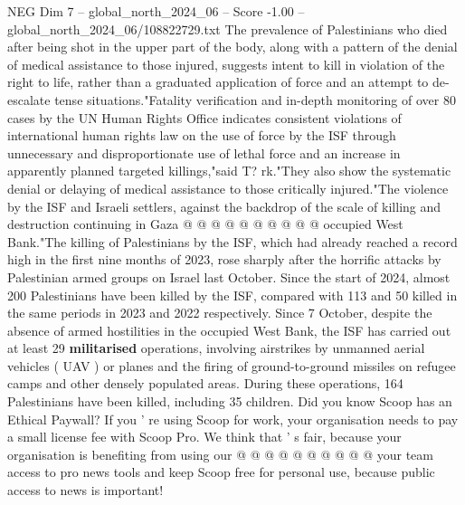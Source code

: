 \begin{textsample}{NEG Dim 7 – global\_north\_2024\_06 – Score -1.00 – global\_north\_2024\_06/108822729.txt}
The prevalence of Palestinians who died after being shot in the upper part of the body, along with a pattern of the denial of medical assistance to those injured, suggests intent to kill in violation of the right to life, rather than a graduated application of force and an attempt to de-escalate tense situations."Fatality verification and in-depth monitoring of over 80 cases by the UN Human Rights Office indicates consistent violations of international human rights law on the use of force by the ISF through unnecessary and disproportionate use of lethal force and an increase in apparently planned targeted killings,"said T? rk."They also show the systematic denial or delaying of medical assistance to those critically injured."The violence by the ISF and Israeli settlers, against the backdrop of the scale of killing and destruction continuing in Gaza @ @ @ @ @ @ @ @ @ @ occupied West Bank."The killing of Palestinians by the ISF, which had already reached a record high in the first nine months of 2023, rose sharply after the horrific attacks by Palestinian armed groups on Israel last October.
Since the start of 2024, almost 200 Palestinians have been killed by the ISF, compared with 113 and 50 killed in the same periods in 2023 and 2022 respectively.
Since 7 October, despite the absence of armed hostilities in the occupied West Bank, the ISF has carried out at least 29 \textbf{militarised} operations, involving airstrikes by unmanned aerial vehicles ( UAV ) or planes and the firing of ground-to-ground missiles on refugee camps and other densely populated areas.
During these operations, 164 Palestinians have been killed, including 35 children.
Did you know Scoop has an Ethical Paywall?
If you ' re using Scoop for work, your organisation needs to pay a small license fee with Scoop Pro.
We think that ' s fair, because your organisation is benefiting from using our @ @ @ @ @ @ @ @ @ @ your team access to pro news tools and keep Scoop free for personal use, because public access to news is important!

\end{textsample}
